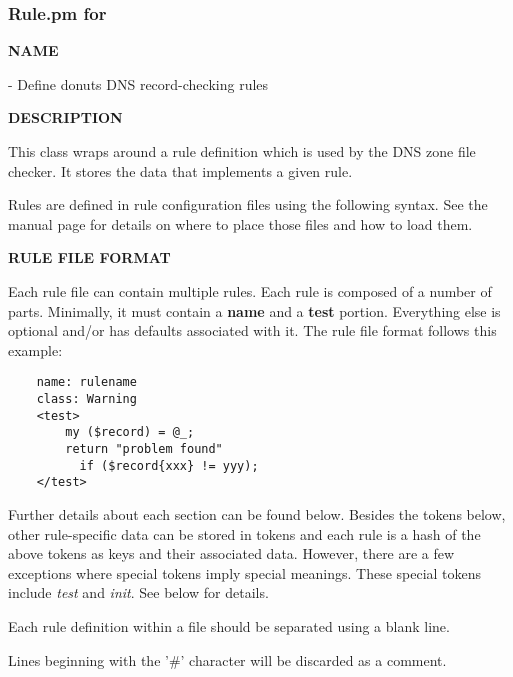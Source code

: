 \clearpage

\subsubsection{Rule.pm for }

{\bf NAME}

 - Define donuts DNS record-checking
rules

{\bf DESCRIPTION}

This class wraps around a rule definition which is used by the 
DNS zone file checker.  It stores the data that implements a given rule.

Rules are defined in  rule configuration files using the
following syntax.  See the  manual page for details on where to
place those files and how to load them.

{\bf RULE FILE FORMAT}

Each rule file can contain multiple rules.  Each rule is composed of a
number of parts.  Minimally, it must contain a {\bf name} and a {\bf test}
portion.  Everything else is optional and/or has defaults associated
with it.  The rule file format follows this example:

\begin{verbatim}
    name: rulename
    class: Warning
    <test>
        my ($record) = @_;
        return "problem found"
          if ($record{xxx} != yyy);
    </test>
\end{verbatim}

Further details about each section can be found below.  Besides the
tokens below, other rule-specific data can be stored in tokens
and each rule is a hash of the above tokens as keys and their
associated data.  However, there are a few exceptions where special
tokens imply special meanings.  These special tokens include {\it test}
and {\it init}.  See below for details.

Each rule definition within a file should be separated using a blank line.

Lines beginning with the '\#' character will be discarded as a comment.

